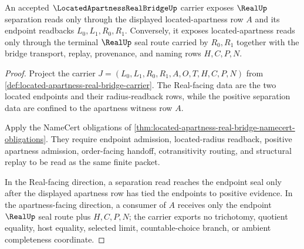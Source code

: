\begin{theorem}
\label{thm:located-apartness-real-two-way-separation}
An accepted $\LocatedApartnessRealBridgeUp$ carrier exposes $\RealUp$ separation reads only through the displayed located-apartness row $A$ and its endpoint readbacks $L_0,L_1,R_0,R_1$. Conversely, it exposes located-apartness reads only through the terminal $\RealUp$ seal route carried by $R_0,R_1$ together with the bridge transport, replay, provenance, and naming rows $H,C,P,N$.
\end{theorem}
\begin{proof}
Project the carrier $J=(L_0,L_1,R_0,R_1,A,O,T,H,C,P,N)$ from \autoref{def:located-apartness-real-bridge-carrier}. The Real-facing data are the two located endpoints and their radius-readback rows, while the positive separation data are confined to the apartness witness row $A$.

Apply the NameCert obligations of \autoref{thm:located-apartness-real-bridge-namecert-obligations}. They require endpoint admission, located-radius readback, positive apartness admission, order-facing handoff, cotransitivity routing, and structural replay to be read as the same finite packet.

In the Real-facing direction, a separation read reaches the endpoint seal only after the displayed apartness row has tied the endpoints to positive evidence. In the apartness-facing direction, a consumer of $A$ receives only the endpoint $\RealUp$ seal route plus $H,C,P,N$; the carrier exports no trichotomy, quotient equality, host equality, selected limit, countable-choice branch, or ambient completeness coordinate.
\end{proof}

